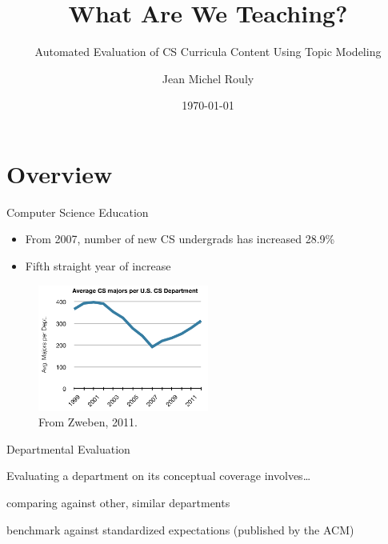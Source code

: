 \documentclass[10pt, compress]{beamer}
\title{What Are We Teaching?}
\subtitle{Automated Evaluation of CS Curricula Content Using Topic Modeling}
\date{\today}
\author[jrouly@gmu.edu]{Jean Michel Rouly}
\institute[Department of Computer Science]{George Mason University}
\begin{document}
\maketitle


\section{Overview}


\begin{frame}{Computer Science Education}
  \begin{itemize}
    \item From 2007, number of new CS undergrads has increased 28.9\%
    \item Fifth straight year of increase
  \end{itemize}

  \begin{figure}
    \centering
    \includegraphics[width=0.5\textwidth]{figs/zweben-cs-majors.png}
    \caption{From Zweben, 2011.}
  \end{figure}
\end{frame}


\begin{frame}{Departmental Evaluation}

  Evaluating a department on its conceptual coverage involves\ldots
  \vfill
  \onslide<+->
  \begin{description}[<+- | alert@+>]
    \item[Relative Standing] comparing against other, similar departments
    \item[Absolute Performance] benchmark against standardized expectations
      (published by the ACM)
  \end{description}
  \vfill

\end{frame}
\end{document}
